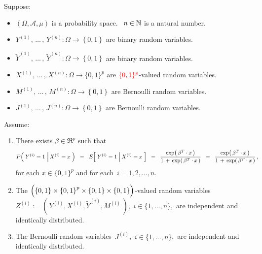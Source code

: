 \vskip 0.5cm
\begin{theorem}\label{ThmLogisticRegressionWithIncorrectData}
\mbox{}\vskip 0.1cm\noindent
Suppose:
\begin{itemize}
\item
	$\left(\Omega,\mathcal{A},\mu\right)$ is a probability space.
	\,
	$n \in \mathbb{N}$ is a natural number.
\item
	$Y^{(1)}, \,\ldots\,,\, Y^{(n)} : \Omega \longrightarrow \left\{0,1\right\}$
	are binary random variables.
\item
	$\widetilde{Y}^{(1)}, \,\ldots\,,\, \widetilde{Y}^{(n)} : \Omega \longrightarrow \left\{0,1\right\}$
	are binary random variables.
\item
	$X^{(1)}, \,\ldots\,,\, X^{(n)} : \Omega \longrightarrow \{0,1\}^{p}$
	are ${\color{red}\{0,1\}^{p}}$-valued random variables.
\item
	$M^{(1)}, \,\ldots\,,\, M^{(n)} : \Omega \longrightarrow \left\{0,1\right\}$
	are Bernoulli random variables.
\item
	$J^{(1)}, \,\ldots\,,\, J^{(n)} : \Omega \longrightarrow \left\{0,1\right\}$
	are Bernoulli random variables.
\end{itemize}
Assume:
\renewcommand{\theenumi}{\alph{enumi}}
\renewcommand{\labelenumi}{\textnormal{(\theenumi)}$\;\;$}
\begin{enumerate}
\item
	There exists $\beta \in \Re^{p}$ such that
	\begin{equation*}
		P\!\left(\; Y^{(i)} = 1 \,\left\vert\, X^{(i)} = x \right.\,\right)
	\;\; = \;\;
		E\!\left[\; Y^{(i)}  = 1 \,\left\vert\, X^{(i)} = x \right.\,\right]
	\;\; = \;\;
		\dfrac{
			\exp\!\left(\,\beta^{T} \cdot x \,\right)
			}{
			1 \,+\, \exp\!\left(\,\beta^{T} \cdot x \,\right)
			}
	\;\; = \;\;
		\dfrac{\exp\!\left(\,\beta^{T} \cdot x \,\right)}{1 \,+\, \exp\!\left(\,\beta^{T} \cdot x \,\right)}\,,
	\quad
	\end{equation*}
	for each $x \in \{0,1\}^{p}$ and for each \,$i = 1,2,\ldots,n$.
\item\label{iIndependence}
	The $\left(\left\{0,1\right\} \overset{{\color{white}.}}{\times} \left\{0,1\right\}^{p} \times \left\{0,1\right\} \times \left\{0,1\right\}\right)$-valued
	random variables
	\,$Z^{(i)} := \left(\,Y^{(i)},X^{(i)},\widetilde{Y}^{(i)},M^{(i)}\,\right)$,
	\,$i \in \{1, \ldots, n\}$,
	\,are independent and identically distributed.
\item\label{Jindependence}
	The Bernoulli random variables \,$J^{(i)}$, \,$i \in \{1, \ldots, n\}$, \,are independent and identically distributed.

\end{enumerate}
\end{theorem}
